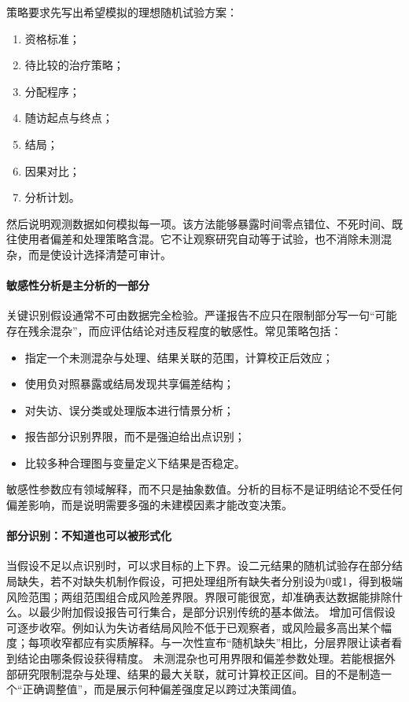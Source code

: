 策略要求先写出希望模拟的理想随机试验方案\parencite{hernanrobins2016}：

\begin{enumerate}
  \item 资格标准；
  \item 待比较的治疗策略；
  \item 分配程序；
  \item 随访起点与终点；
  \item 结局；
  \item 因果对比；
  \item 分析计划。
\end{enumerate}

然后说明观测数据如何模拟每一项。该方法能够暴露时间零点错位、不死时间、既往使用者偏差和处理策略含混。它不让观察研究自动等于试验，也不消除未测混杂，而是使设计选择清楚可审计。

\paragraph{敏感性分析是主分析的一部分}

关键识别假设通常不可由数据完全检验。严谨报告不应只在限制部分写一句“可能存在残余混杂”，而应评估结论对违反程度的敏感性。常见策略包括：

\begin{itemize}
  \item 指定一个未测混杂与处理、结果关联的范围，计算校正后效应；
  \item 使用负对照暴露或结局发现共享偏差结构；
  \item 对失访、误分类或处理版本进行情景分析；
  \item 报告部分识别界限，而不是强迫给出点识别；
  \item 比较多种合理图与变量定义下结果是否稳定。
\end{itemize}

敏感性参数应有领域解释，而不只是抽象数值。分析的目标不是证明结论不受任何偏差影响，而是说明需要多强的未建模因素才能改变决策。

\paragraph{部分识别：不知道也可以被形式化}

当假设不足以点识别时，可以求目标的上下界。设二元结果的随机试验存在部分结局缺失，若不对缺失机制作假设，可把处理组所有缺失者分别设为0或1，得到极端风险范围；两组范围组合成风险差界限。界限可能很宽，却准确表达数据能排除什么。以最少附加假设报告可行集合，是部分识别传统的基本做法\parencite{manski1990}。
增加可信假设可逐步收窄。例如认为失访者结局风险不低于已观察者，或风险最多高出某个幅度；每项收窄都应有实质解释。与一次性宣布“随机缺失”相比，分层界限让读者看到结论由哪条假设获得精度。
未测混杂也可用界限和偏差参数处理。若能根据外部研究限制混杂与处理、结果的最大关联，就可计算校正区间。目的不是制造一个“正确调整值”，而是展示何种偏差强度足以跨过决策阈值。

